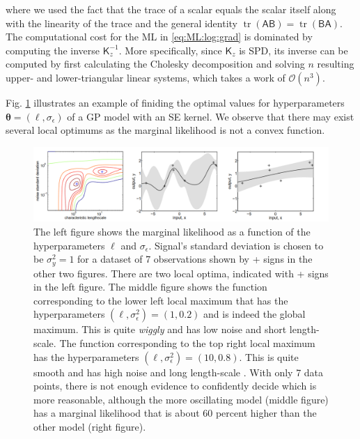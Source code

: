 \documentclass[10pt]{article}
\theoremstyle{definition}
\DeclareMathOperator{\tr}{tr}
\begin{document}
where we used the fact that the trace of a scalar equals the scalar itself along with the linearity of the trace and the general identity $\tr(\mathsf{A}\mathsf{B})=\tr(\mathsf{B}\mathsf{A})$. The computational cost for the ML in \cref{eq:ML:log:grad} is dominated by computing the inverse $\mathsf{K}_z^{-1}$. More specifically, since $\mathsf{K}_z$ is SPD, its inverse can be computed by first calculating the Cholesky decomposition and solving $n$ resulting upper- and lower-triangular linear systems, which takes a work of $\mathcal{O}(n^3)$.

Fig. \ref{fig:marginal:likelihood} illustrates an example of finiding the optimal values for hyperparameters $\boldsymbol{\theta}=(\ell, \sigma_{\epsilon})$ of a GP model with an SE kernel. We observe that there may exist several local optimums as the marginal likelihood is not a convex function.
\begin{figure}[t!]
\centering
\includegraphics[width=17cm]{figs/marginal-likelihood.png}
\caption{The left figure shows the marginal likelihood as a function of the hyperparameters $\ell$ and $\sigma_{\epsilon}$. Signal's standard
deviation is chosen to be $\sigma_y^2 = 1$ for a dataset of 7 observations shown by + signs in the other two figures. There are two local optima, indicated with + signs in the left figure. The middle figure shows the function corresponding to the lower left local maximum that has the hyperparameters $(\ell, \sigma_{\epsilon}^2)=(1, 0.2)$ and is indeed the global maximum. This is quite \textit{wiggly} and has low noise and short length-scale. The function corresponding to the top right local maximum has the hyperparameters $(\ell, \sigma_{\epsilon}^2)=(10, 0.8)$. This is quite smooth and has high noise and long length-scale \cite[Section 5.4.1]{Rasmussen2006}. With only 7 data points, there is not enough evidence to confidently decide which is more reasonable, although the more oscillating model (middle figure) has a marginal likelihood that is about 60 percent higher than the other model (right figure)\cite[Section 15.2.4]{Murphy2012}.}
\label{fig:marginal:likelihood}
\end{figure}
\end{document}
